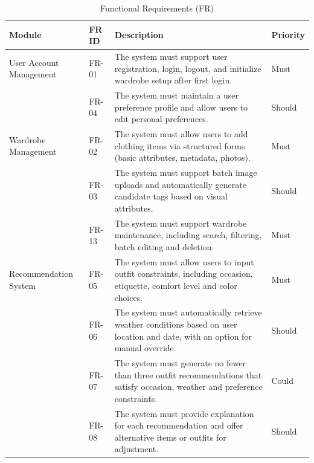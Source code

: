 \newpage
\begin{table}[ht]
\centering
\small
\caption{Functional Requirements (FR)}
\label{tab:functional_requirements}
\renewcommand{\arraystretch}{1.2}
\begin{tabular}{p{2.8cm}p{1.6cm}p{9cm}p{1.4cm}}
    \toprule
    \textbf{Module} & \textbf{FR ID} & \textbf{Description} & \textbf{Priority} \\
    \midrule
    User Account Management & 
    FR-01 &
    The system must support user registration, login, logout, and initialize wardrobe setup after first login.  & 
    Must \\

          &
    FR-04 &
    The system must maintain a user preference profile and allow users to edit personal preferences.  &
    Should \\

    Wardrobe Management &
    FR-02 &
    The system must allow users to add clothing items via structured forms (basic attributes, metadata, photos). & 
    Must \\

          &
    FR-03 &
    The system must support batch image uploads and automatically generate candidate tags based on visual attributes.  &
    Should \\

          &
    FR-13 &
    The system must support wardrobe maintenance, including search, filtering, batch editing and deletion. &
    Must \\

    Recommendation System &
    FR-05 &
    The system must allow users to input outfit constraints, including occasion, etiquette, comfort level and color choices. &
    Must \\
    
          &
    FR-06 &
    The system must automatically retrieve weather conditions based on user location and date, with an option for manual override. & 
    Should \\
    
          &
    FR-07 &
    The system must generate no fewer than three outfit recommendations that satisfy occasion, weather and preference constraints. &
    Could \\
    
          &
    FR-08 &
    The system must provide explanation for each recommendation and offer alternative items or outfits for adjustment. &
    Should \\


\end{tabular}
\end{table}

